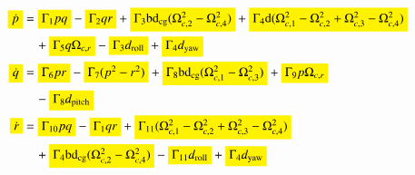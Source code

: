 \documentclass[3p]{elsarticle}
\begin{document}

\begin{align}
    \colorbox{yellow}{$\dot{p}$} &= \colorbox{yellow}{$\Gamma_1 pq$} - \colorbox{yellow}{$\Gamma_2 qr$} + \colorbox{yellow}{$\Gamma_3 \mathrm{b}\mathrm{d}_{\text{cg}} (\Omega_{c, 2}^2 - \Omega_{c, 4}^2)$} + \colorbox{yellow}{$\Gamma_4 \mathrm{d} (\Omega_{c, 1}^2 - \Omega_{c, 2}^2 + \Omega_{c, 3}^2 - \Omega_{c, 4}^2)$} \notag \\
    &\quad + \colorbox{yellow}{$\Gamma_5 q \Omega_{c, r}$} - \colorbox{yellow}{$\Gamma_3 d_{\text{roll}}$} + \colorbox{yellow}{$\Gamma_4 d_{\text{yaw}}$} \\
    \colorbox{yellow}{$\dot{q}$} &= \colorbox{yellow}{$\Gamma_6 pr$} - \colorbox{yellow}{$\Gamma_7 (p^2 - r^2)$} + \colorbox{yellow}{$\Gamma_8 \mathrm{b}\mathrm{d}_{\text{cg}}(\Omega_{c, 1}^2 - \Omega_{c, 3}^2)$} + \colorbox{yellow}{$\Gamma_9 p \Omega_{c, r}$} \notag \\
    &\quad - \colorbox{yellow}{$\Gamma_8 d_{\text{pitch}}$} \\
    \colorbox{yellow}{$\dot{r}$} &= \colorbox{yellow}{$\Gamma_{10} pq$} - \colorbox{yellow}{$\Gamma_{1} qr$} + \colorbox{yellow}{$\Gamma_{11} (\Omega_{c, 1}^2 - \Omega_{c, 2}^2 + \Omega_{c, 3}^2 - \Omega_{c, 4}^2)$} \notag \\
    &\quad + \colorbox{yellow}{$\Gamma_{4} \mathrm{b}\mathrm{d}_{\text{cg}} (\Omega_{c, 2}^2 - \Omega_{c, 4}^2)$} - \colorbox{yellow}{$\Gamma_{11} d_{\text{roll}}$} + \colorbox{yellow}{$\Gamma_{4} d_{\text{yaw}}$}
\end{align}
\end{document}
